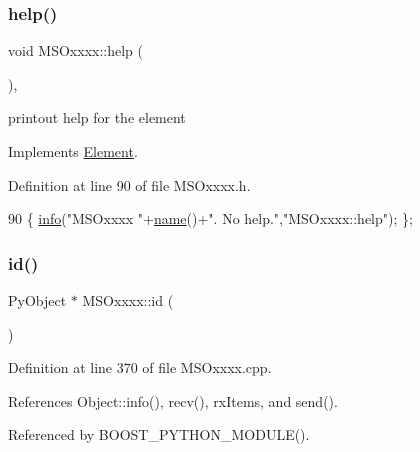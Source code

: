 \subsubsection{\texorpdfstring{help()}{help()}}
{\footnotesize\ttfamily void M\+S\+Oxxxx\+::help (\begin{DoxyParamCaption}{ }\end{DoxyParamCaption})\hspace{0.3cm}{\ttfamily [inline]}, {\ttfamily [virtual]}}

printout help for the element 

Implements \hyperlink{classElement_a32c0de27acb08e17251cef88c3e9303a}{Element}.



Definition at line 90 of file M\+S\+Oxxxx.\+h.


\begin{DoxyCode}
90 \{ \hyperlink{classObject_a644fd329ea4cb85f54fa6846484b84a8}{info}(\textcolor{stringliteral}{"MSOxxxx "}+\hyperlink{classObject_a300f4c05dd468c7bb8b3c968868443c1}{name}()+\textcolor{stringliteral}{". No help."},\textcolor{stringliteral}{"MSOxxxx::help"}); \};
\end{DoxyCode}
\mbox{\label{classMSOxxxx_a0f14b23d31d8e7647184e99a89600cc3}} 
\subsubsection{\texorpdfstring{id()}{id()}}
{\footnotesize\ttfamily Py\+Object $\ast$ M\+S\+Oxxxx\+::id (\begin{DoxyParamCaption}{ }\end{DoxyParamCaption})}



Definition at line 370 of file M\+S\+Oxxxx.\+cpp.



References Object\+::info(), recv(), rx\+Items, and send().



Referenced by B\+O\+O\+S\+T\+\_\+\+P\+Y\+T\+H\+O\+N\+\_\+\+M\+O\+D\+U\+L\+E().


